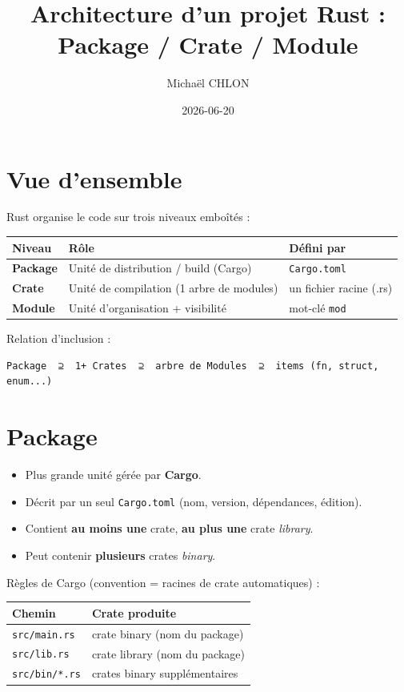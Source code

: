 \documentclass[11pt]{article}
\author{Michaël CHLON}
\date{2026-06-20}
\title{Architecture d'un projet Rust : Package / Crate / Module}
\begin{document}
\maketitle
\setcounter{tocdepth}{2}
\tableofcontents

\section{Vue d'ensemble}
\label{sec:org49e60e1}

Rust organise le code sur trois niveaux emboîtés :

\begin{center}
\begin{tabular}{lll}
Niveau & Rôle & Défini par\\
\hline
\textbf{Package} & Unité de distribution / build (Cargo) & \texttt{Cargo.toml}\\
\textbf{Crate} & Unité de compilation (1 arbre de modules) & un fichier racine (.rs)\\
\textbf{Module} & Unité d'organisation + visibilité & mot-clé \texttt{mod}\\
\end{tabular}
\end{center}

Relation d'inclusion :

\begin{verbatim}
Package  ⊇  1+ Crates  ⊇  arbre de Modules  ⊇  items (fn, struct, enum...)
\end{verbatim}
\section{Package}
\label{sec:org5227173}

\begin{itemize}
\item Plus grande unité gérée par \textbf{Cargo}.
\item Décrit par un seul \texttt{Cargo.toml} (nom, version, dépendances, édition).
\item Contient \textbf{au moins une} crate, \textbf{au plus une} crate \emph{library}.
\item Peut contenir \textbf{plusieurs} crates \emph{binary}.
\end{itemize}

Règles de Cargo (convention = racines de crate automatiques) :

\begin{center}
\begin{tabular}{ll}
Chemin & Crate produite\\
\hline
\texttt{src/main.rs} & crate binary (nom du package)\\
\texttt{src/lib.rs} & crate library (nom du package)\\
\texttt{src/bin/*.rs} & crates binary supplémentaires\\
\end{tabular}
\end{center}
\end{document}
